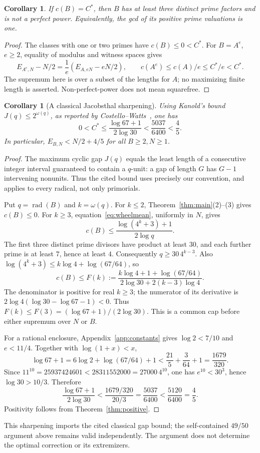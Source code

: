 \documentclass[11pt]{article}
\newtheorem{corollary}[theorem]{Corollary}
\theoremstyle{definition}\newtheorem{definition}[theorem]{Definition}
\theoremstyle{remark}\newtheorem{remark}[theorem]{Remark}
\newcommand{\rad}{\operatorname{rad}}
\begin{document}
\begin{corollary}\label{cor:extremal-base}
If \(c(B)=C^*\), then \(B\) has at least three distinct prime factors and
is not a perfect power. Equivalently, the gcd of its positive prime
valuations is one.
\end{corollary}
\begin{proof}
The classes with one or two primes have \(c(B)\le0<C^*\).
For \(B=A^e\), \(e\ge2\), equality of modulus and witness spaces gives
\[
 E_{A^e,N}-N/2=\frac1e(E_{A,eN}-eN/2),\qquad
 c(A^e)\le c(A)/e\le C^*/e<C^*.
\]
The supremum here is over a subset of the lengths for \(A\); no
maximizing finite length is asserted. Non-perfect-power does not
mean squarefree.
\end{proof}

\begin{corollary}[A classical Jacobsthal sharpening]\label{cor:kanold}
Using Kanold's bound \(J(q)\le2^{\omega(q)}\), as reported by
Costello--Watts~\cite[Introduction, pp.~1--2]{CostelloWatts}, one has
\[
 0<C^*\le\frac{\log67+1}{2\log30}
       <\frac{5037}{6400}<\frac45.
\]
In particular, \(E_{B,N}<N/2+4/5\) for all \(B\ge2,N\ge1\).
\end{corollary}
\begin{proof}
The maximum cyclic gap \(J(q)\) equals the least length of a consecutive
integer interval guaranteed to contain a \(q\)-unit: a gap of length \(G\)
has \(G-1\) intervening nonunits. Thus the cited bound uses precisely our
convention, and applies to every radical, not only primorials.

Put \(q=\rad(B)\) and \(k=\omega(q)\). For \(k\le2\),
Theorem~\ref{thm:main}(2)--(3) gives \(c(B)\le0\).
For \(k\ge3\), equation~\eqref{eq:wheelmean}, uniformly in \(N\), gives
\[
 c(B)\le\frac{\log(4^k+3)+1}{2\log q}.
\]
The first three distinct prime divisors have product at least \(30\),
and each further prime is at least \(7\), hence at least \(4\).
Consequently \(q\ge30\,4^{k-3}\). Also
\(\log(4^k+3)\le k\log4+\log(67/64)\), so
\[
 c(B)\le F(k):=
 \frac{k\log4+1+\log(67/64)}{2\log30+2(k-3)\log4}.
\]
The denominator is positive for real \(k\ge3\); the numerator of its
derivative is \(2\log4(\log30-\log67-1)<0\).
Thus \(F(k)\le F(3)=(\log67+1)/(2\log30)\).
This is a common cap before either supremum over \(N\) or \(B\).

For a rational enclosure, Appendix~\ref{app:constants} gives
\(\log2<7/10\) and \(e<11/4\). Together with \(\log(1+x)<x\),
\[
 \log67+1=6\log2+\log(67/64)+1
 <\frac{21}{5}+\frac3{64}+1=\frac{1679}{320}.
\]
Since \(11^{10}=25937424601<28311552000=27000\,4^{10}\),
one has \(e^{10}<30^3\), hence \(\log30>10/3\). Therefore
\[
 \frac{\log67+1}{2\log30}
 <\frac{1679/320}{20/3}=\frac{5037}{6400}
 <\frac{5120}{6400}=\frac45.
\]
Positivity follows from Theorem~\ref{thm:positive}.
\end{proof}
This sharpening imports the cited classical gap bound; the self-contained
\(49/50\) argument above remains valid independently.
The argument does not determine the optimal correction or its extremizers.
\end{document}
